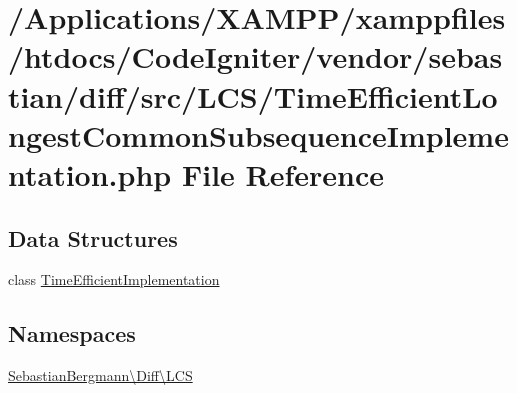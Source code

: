\hypertarget{_time_efficient_longest_common_subsequence_implementation_8php}{}\section{/\+Applications/\+X\+A\+M\+P\+P/xamppfiles/htdocs/\+Code\+Igniter/vendor/sebastian/diff/src/\+L\+C\+S/\+Time\+Efficient\+Longest\+Common\+Subsequence\+Implementation.php File Reference}
\label{_time_efficient_longest_common_subsequence_implementation_8php}
\subsection*{Data Structures}
\begin{DoxyCompactItemize}
\item 
class \mbox{\hyperlink{class_sebastian_bergmann_1_1_diff_1_1_l_c_s_1_1_time_efficient_implementation}{Time\+Efficient\+Implementation}}
\end{DoxyCompactItemize}
\subsection*{Namespaces}
\begin{DoxyCompactItemize}
\item 
 \mbox{\hyperlink{namespace_sebastian_bergmann_1_1_diff_1_1_l_c_s}{Sebastian\+Bergmann\textbackslash{}\+Diff\textbackslash{}\+L\+CS}}
\end{DoxyCompactItemize}
